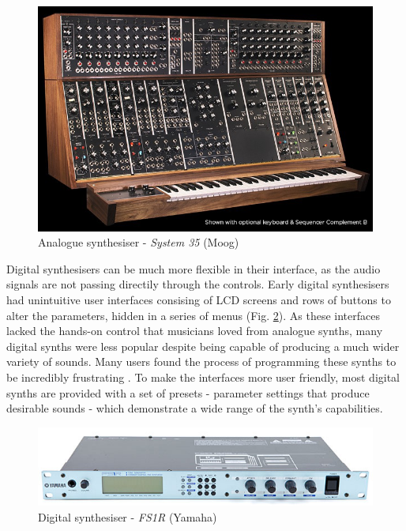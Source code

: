 \documentclass[11pt, oneside]{report}   	%
\begin{document}
\begin{figure}[h]
	\centering
	\includegraphics[width = 5in]{MoogSystem35.jpg}
	\caption{Analogue synthesiser - \emph{System 35} (Moog) \cite{MoogSystem35}}
	\label{fig:MoogSystem35}
\end{figure}
%
Digital synthesisers can be much more flexible in their interface, as the audio signals are not passing directily through the controls. Early digital synthesisers had unintuitive user interfaces consising of LCD screens and rows of buttons to alter the parameters, hidden in a series of menus (Fig. \ref{fig:YamahFS1R}). As these interfaces lacked the hands-on control that musicians loved from analogue synths, many digital synths were less popular despite being capable of producing a much wider variety of sounds. Many users found the process of programming these synths to be incredibly frustrating \cite{Synth}. To make the interfaces more user friendly, most digital synths are provided with a set of presets - parameter settings that produce desirable sounds - which demonstrate a wide range of the synth's capabilities. %
%
\begin{figure}[h] 
	\centering
	\includegraphics[trim = {0, 0.2cm, 0, 0.5cm}, clip, width = 5in]{yamaha_fs1r.jpg}
	\caption{Digital synthesiser - \emph{FS1R} (Yamaha) \cite{FS1R}}
	\label{fig:YamahFS1R}
	\vspace{-10pt}
\end{figure}\\
\end{document}
